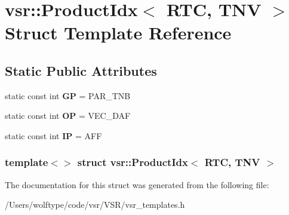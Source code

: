 \hypertarget{structvsr_1_1_product_idx_3_01_r_t_c_00_01_t_n_v_01_4}{\section{vsr\-:\-:Product\-Idx$<$ R\-T\-C, T\-N\-V $>$ Struct Template Reference}
\label{structvsr_1_1_product_idx_3_01_r_t_c_00_01_t_n_v_01_4}
}
\subsection*{Static Public Attributes}
\begin{DoxyCompactItemize}
\item 
\hypertarget{structvsr_1_1_product_idx_3_01_r_t_c_00_01_t_n_v_01_4_a56fdf0542c3ddfc790bc8d1ab694c5bd}{static const int {\bfseries G\-P} = P\-A\-R\-\_\-\-T\-N\-B}\label{structvsr_1_1_product_idx_3_01_r_t_c_00_01_t_n_v_01_4_a56fdf0542c3ddfc790bc8d1ab694c5bd}

\item 
\hypertarget{structvsr_1_1_product_idx_3_01_r_t_c_00_01_t_n_v_01_4_a5814c52c6130f877618dca210840ff03}{static const int {\bfseries O\-P} = V\-E\-C\-\_\-\-D\-A\-F}\label{structvsr_1_1_product_idx_3_01_r_t_c_00_01_t_n_v_01_4_a5814c52c6130f877618dca210840ff03}

\item 
\hypertarget{structvsr_1_1_product_idx_3_01_r_t_c_00_01_t_n_v_01_4_a9f3a9798bb4931df1a0448525dab5357}{static const int {\bfseries I\-P} = A\-F\-F}\label{structvsr_1_1_product_idx_3_01_r_t_c_00_01_t_n_v_01_4_a9f3a9798bb4931df1a0448525dab5357}

\end{DoxyCompactItemize}
\subsubsection*{template$<$$>$ struct vsr\-::\-Product\-Idx$<$ R\-T\-C, T\-N\-V $>$}



The documentation for this struct was generated from the following file\-:\begin{DoxyCompactItemize}
\item 
/\-Users/wolftype/code/vsr/\-V\-S\-R/vsr\-\_\-templates.\-h\end{DoxyCompactItemize}
